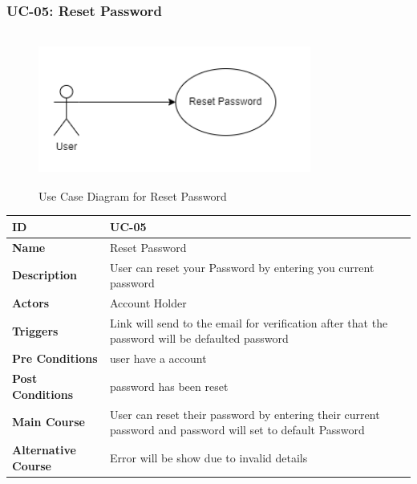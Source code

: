     \subsubsection{UC-05: Reset Password}
    \begin{figure}[H]
        \includegraphics[height=5cm, width=0.8\textwidth]{./diagrams/Use Case/u5.png}
        \centering 
        \caption{Use Case Diagram for Reset Password}
        \label{fig:Usecase1}
        \end{figure}
        
    \begin{center}
        \begin{tabularx}{\textwidth}{|l|X|}
            \hline
            \textbf{ID} & UC-05 \\
            \hline
            \textbf{Name} & Reset Password \\
            \hline
            \textbf{Description} & User can reset your Password by entering you current password \\
            \hline
            \textbf{Actors} & Account Holder \\
            \hline
            \textbf{Triggers} & Link will send to the email for verification after that the password will be defaulted password \\
            \hline
            \textbf{Pre Conditions} & user have a account \\
            \hline
            \textbf{Post Conditions} & password has been reset \\
            \hline
            \textbf{Main Course} & User can reset their password by entering their current password and password will set to default Password \\
            \hline
            \textbf{Alternative Course} & Error will be show due to invalid details \\
            \hline
            
        \end{tabularx}
    \end{center}
    \newpage
    


